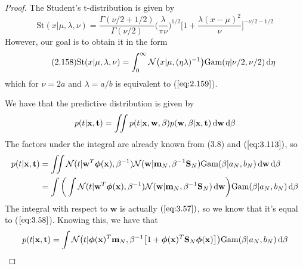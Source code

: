 \vspace{1em}

\begin{proof}
    The Student's t-distribution is given by
    \begin{equation}\label{eq:2.159}\tag{2.159}
        \text{St}(x | \mu, \lambda, \nu)
        = \frac{\Gamma(\nu/2 + 1/2)}{\Gamma(\nu/2)} \bigg(\frac{\lambda}{\pi \nu}\bigg)^{1/2}
        \bigg[1 + \frac{\lambda(x - \mu)^2}{\nu}\bigg]^{-\nu/2 - 1/2}
    \end{equation}
    However, our goal is to obtain it in the form
    \begin{equation}\label{eq:2.158}\tag{2.158}
        \text{St}(x | \mu, \lambda, \nu)
        = \int_{0}^{\infty} \mathcal{N}\big(x | \mu, (\eta\lambda)^{-1}\big)
        \text{Gam}(\eta | \nu/2, \nu/2) \mathop{}\!\mathrm{d} \eta
    \end{equation}
    which for $\nu = 2a$ and $\lambda = a/b$ is equivalent to ($\ref{eq:2.159}$). 

    We have that the predictive distribution is given by
    \[
        p(t | \mathbf{x}, \mathbf{t}) 
        = \iint p(t | \mathbf{x}, \mathbf{w}, \beta) p(\mathbf{w}, \beta | \mathbf{x}, \mathbf{t})
        \mathop{}\!\mathrm{d} \mathbf{w} \mathop{}\!\mathrm{d} \beta
    \] 
    The factors under the integral are already known from (3.8) and 
    $(\ref{eq:3.113})$, so
    \begin{align*}
        p(t | \mathbf{x}, \mathbf{t}) 
        &= \iint \mathcal{N}(t | \mathbf{w}^T\bm{\phi}(\mathbf{x}), \beta^{-1}) 
            \mathcal{N}(\mathbf{w} | \mathbf{m}_N, \beta^{-1} \mathbf{S}_N) 
            \text{Gam}(\beta | a_N, b_N)
            \mathop{}\!\mathrm{d} \mathbf{w} \mathop{}\!\mathrm{d} \beta \\
        &= \int \bigg(\int \mathcal{N}(t | \mathbf{w}^T\bm{\phi}(\mathbf{x}), \beta^{-1}) 
            \mathcal{N}(\mathbf{w} | \mathbf{m}_N, \beta^{-1} \mathbf{S}_N) 
            \mathop{}\!\mathrm{d} \mathbf{w}\bigg)
            \text{Gam}(\beta | a_N, b_N)
            \mathop{}\!\mathrm{d} \beta
    \end{align*}
    The integral with respect to $\mathbf{w}$ is actually $(\ref{eq:3.57})$, so
    we know that it's equal to ($\ref{eq:3.58}$). Knowing this, we have that
    \[
        p(t | \mathbf{x}, \mathbf{t}) 
        = \int \mathcal{N}\big(t | \bm{\phi}(\mathbf{x})^T\mathbf{m}_N, 
        \beta^{-1} \big[1 + \bm{\phi}(\mathbf{x})^T\mathbf{S}_N\bm{\phi}(\mathbf{x})\big]\big)
        \text{Gam}(\beta | a_N, b_N) \mathop{}\!\mathrm{d} \beta
    \] 
\end{proof}

